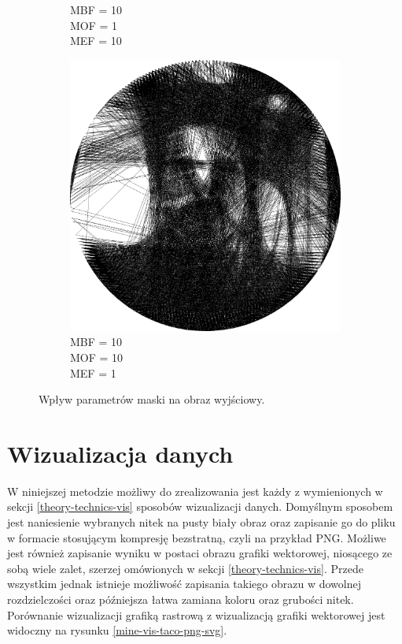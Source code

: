 \begin{figure}[htb]
\begin{subfigure}{0.24\textwidth}
        \caption{MBF = 10 \\ MOF = 1 \\ MEF = 10}
        \label{mine-param-taco-thread-h}
    \end{subfigure}
    \begin{subfigure}{0.24\textwidth}
        \centering
        \includegraphics[width = \textwidth]{img/4-mine/taco-thread/taco_e_i3000_c20_inv0_bg10_obj10_ed1.png}
        \caption{MBF = 10 \\ MOF = 10 \\ MEF = 1}
        \label{mine-param-taco-thread-i}
    \end{subfigure}
    \caption{Wpływ parametrów maski na obraz wyjściowy.}
    \label{mine-param-taco-thread}
    \end{figure}
    \section{Wizualizacja danych} \label{mine-vis}
    W niniejszej metodzie możliwy do zrealizowania jest każdy z wymienionych w sekcji \ref{theory-technics-vis} sposobów wizualizacji danych. Domyślnym sposobem jest naniesienie wybranych nitek na pusty biały obraz oraz zapisanie go do pliku w formacie stosującym kompresję bezstratną, czyli na przykład PNG. Możliwe jest również zapisanie wyniku w postaci obrazu grafiki wektorowej, niosącego ze sobą wiele zalet, szerzej omówionych w sekcji \ref{theory-technics-vis}. Przede wszystkim jednak istnieje możliwość zapisania takiego obrazu w dowolnej rozdzielczości oraz późniejsza łatwa zamiana koloru oraz grubości nitek. Porównanie wizualizacji grafiką rastrową z wizualizacją grafiki wektorowej jest widoczny na rysunku \ref{mine-vis-taco-png-svg}.
    
